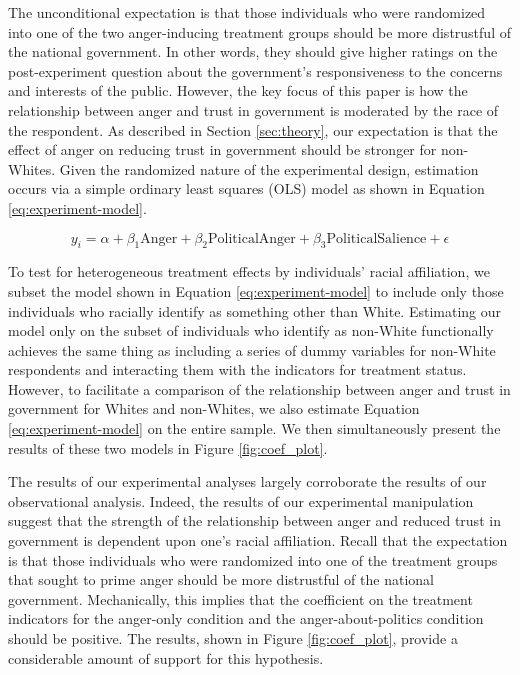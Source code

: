 \documentclass[12pt, letterpaper]{article}
\begin{document}
The unconditional expectation is that those individuals who were randomized into one of the two anger-inducing treatment groups should be more distrustful of the national government. In other words, they should give higher ratings on the post-experiment question about the government's responsiveness to the concerns and interests of the public. However, the key focus of this paper is how the relationship between anger and trust in government is moderated by the race of the respondent. As described in Section \ref{sec:theory}, our expectation is that the effect of anger on reducing trust in government should be stronger for non-Whites. Given the randomized nature of the experimental design, estimation occurs via a simple ordinary least squares (OLS) model as shown in Equation \ref{eq:experiment-model}.

\vspace{-13mm}
\begin{center}
\begin{equation}
y_i = \alpha + \beta_1 \textrm{Anger} + \beta_2 \textrm{PoliticalAnger} + \beta_3 \textrm{PoliticalSalience} + \epsilon
\label{eq:experiment-model}
\end{equation}
\end{center}

To test for heterogeneous treatment effects by individuals' racial affiliation, we subset the model shown in Equation \ref{eq:experiment-model} to include only those individuals who racially identify as something other than White. Estimating our model only on the subset of individuals who identify as non-White functionally achieves the same thing as including a series of dummy variables for non-White respondents and interacting them with the indicators for treatment status. However, to facilitate a comparison of the relationship between anger and trust in government for Whites and non-Whites, we also estimate Equation \ref{eq:experiment-model} on the entire sample. We then simultaneously present the results of these two models in Figure \ref{fig:coef_plot}.

The results of our experimental analyses largely corroborate the results of our observational analysis. Indeed, the results of our experimental manipulation suggest that the strength of the relationship between anger and reduced trust in government is dependent upon one's racial affiliation. Recall that the expectation is that those individuals who were randomized into one of the treatment groups that sought to prime anger should be more distrustful of the national government. Mechanically, this implies that the coefficient on the treatment indicators for the anger-only condition and the anger-about-politics condition should be positive. The results, shown in Figure \ref{fig:coef_plot}, provide a considerable amount of support for this hypothesis.
\end{document}

